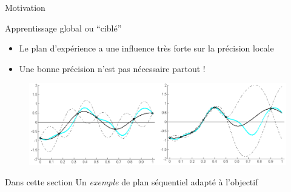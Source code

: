 \begin{frame}{Motivation}
\begin{block}{Apprentissage global ou ``ciblé''}
\begin{itemize}
 \item Le plan d'expérience a une influence très forte sur la précision locale
 \item Une bonne précision n'est pas nécessaire partout !
\end{itemize}
\end{block}

\begin{figure}
\centering
\includegraphics[width=\textwidth]{figT/two7pointskrigs.png} 
\end{figure}

\begin{alertblock}{Dans cette section}
 Un \textit{exemple} de plan séquentiel adapté à l'objectif
\end{alertblock}
\end{frame}

